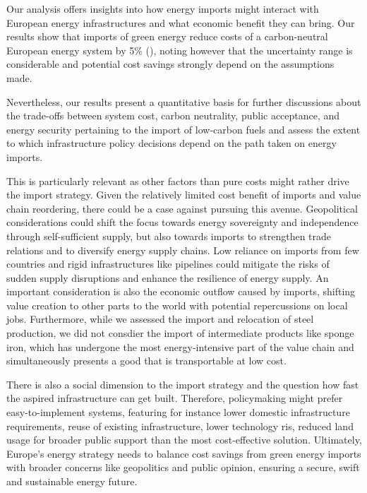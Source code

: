 
Our analysis offers insights into how energy imports might interact with
European energy infrastructures and what economic benefit they can bring. Our
results show that imports of green energy reduce costs of a carbon-neutral
European energy system by 5\% (), noting however that the uncertainty
range is considerable and potential cost savings strongly depend on the
assumptions made.

Nevertheless, our results present a quantitative basis for further discussions
about the trade-offs between system cost, carbon neutrality, public acceptance, 
and energy security pertaining to the import of low-carbon fuels and assess the
extent to which infrastructure policy decisions depend on the path taken on
energy imports.

This is particularly relevant as other factors than pure costs might rather
drive the import strategy. Given the relatively limited cost benefit of imports
and value chain reordering, there could be a case against pursuing this avenue.
Geopolitical considerations could shift the focus towards energy sovereignty and
independence through self-sufficient supply, but also towards imports to
strengthen trade relations and to diversify energy supply chains. Low reliance
on imports from few countries and rigid infrastructures like pipelines could
mitigate the risks of sudden supply disruptions and enhance the resilience of
energy supply. An important consideration is also the economic outflow caused by
imports, shifting value creation to other parts to the world with potential
repercussions on local jobs. Furthermore, while we assessed the import and
relocation of steel production, we did not consdier the import of intermediate
products like sponge iron, which has undergone the most energy-intensive part of
the value chain and simultaneously presents a good that is transportable at low
cost.

There is also a social dimension to the import strategy and the question how
fast the aspired infrastructure can get built. Therefore, policymaking might
prefer easy-to-implement systems, featuring for instance lower domestic
infrastructure requirements, reuse of existing infrastructure, lower technology
ris, reduced land usage for broader public support than the most cost-effective
solution. Ultimately, Europe's energy strategy needs to balance cost savings
from green energy imports with broader concerns like geopolitics and public
opinion, ensuring a secure, swift and sustainable energy future.
